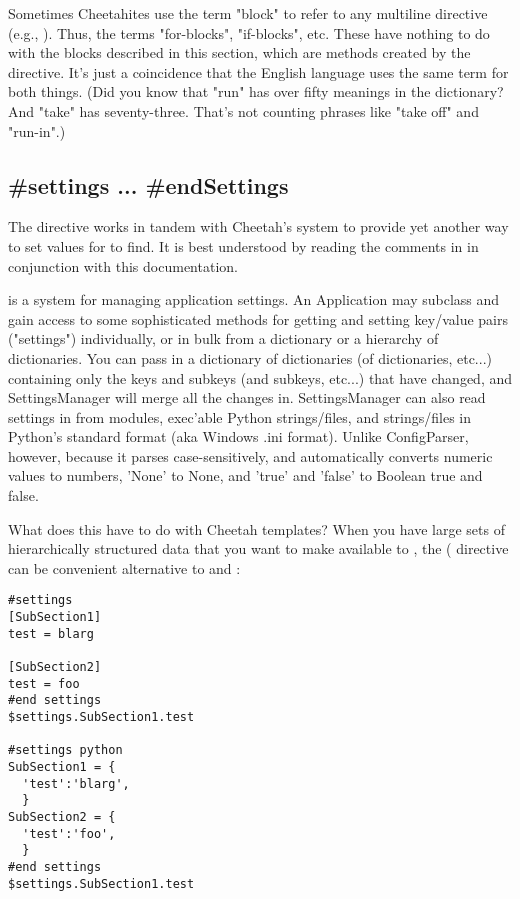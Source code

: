 Sometimes Cheetahites use the term "block" to refer to any multiline directive
(e.g., ).  Thus, the terms "for-blocks", "if-blocks",
etc.  These have nothing to do with the blocks described in this section, which
are methods created by the  directive.  It's just a coincidence
that the English language uses the same term for both things.  (Did you know 
that "run" has over fifty meanings in the dictionary?  And "take" has
seventy-three.  That's not counting phrases like "take off" and "run-in".)


\subsection{\#settings ... \#endSettings}
\label{inheritanceEtc.settings}

The  directive works in tandem with Cheetah's
 system to provide yet another way to set values for
 to find.  It is best understood by reading the comments in
 in conjunction with this documentation.

 is a system for managing application settings.  An
Application may subclass  and gain access
to some sophisticated methods for getting and setting key/value pairs
("settings") individually, or in bulk from a dictionary or a hierarchy of
dictionaries.  You can pass in a dictionary of dictionaries (of dictionaries,
etc...) containing only the keys and subkeys (and subkeys, etc...) that have
changed, and SettingsManager will merge all the changes in.  SettingsManager can
also read settings in from modules, exec'able Python strings/files, and
strings/files in Python's standard  format (aka Windows .ini
format).  Unlike ConfigParser, however, because it parses case-sensitively, and
automatically converts numeric values to numbers, 'None' to None, and 'true' and
'false' to Boolean true and false.

What does this have to do with Cheetah templates? When you have large sets of
hierarchically structured data that you want to make available to
, the ( directive can be convenient
alternative to  and :

\begin{verbatim}
#settings
[SubSection1]
test = blarg

[SubSection2]
test = foo
#end settings
$settings.SubSection1.test

#settings python
SubSection1 = {
  'test':'blarg',
  }
SubSection2 = {
  'test':'foo',
  }
#end settings
$settings.SubSection1.test
\end{verbatim}

